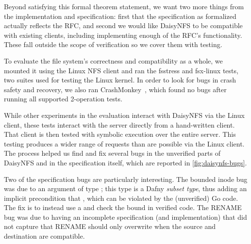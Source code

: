 Beyond satisfying this formal theorem statement, we want two more things from
the implementation and specification: first that the specification as formalized
actually reflects the RFC, and second we would like DaisyNFS to be compatible
with existing clients, including implementing enough of the RFC's functionality.
These fall outside the scope of verification so we cover them with testing.

To evaluate the file system's correctness and compatibility as a whole, we
mounted it using the Linux NFS client and ran the fsstress and fsx-linux tests,
two suites used for testing the Linux kernel. In order to look for bugs in crash
safety and recovery, we also ran CrashMonkey~\cite{mohan:crashmonkey}, which
found no bugs after running all supported 2-operation tests.

While other experiments in the evaluation interact with DaisyNFS via the Linux
client, these tests interact with the server directly from a hand-written
client. That client is then tested with symbolic execution over the entire server.
This testing produces a wider range of requests than are possible via the Linux
client. The process helped us find and fix several bugs in the unverified parts
of DaisyNFS and in the specification itself, which are reported in
\cref{fig:daisynfs-bugs}.

Two of the specification bugs are particularly interesting. The bounded inode bug
was due to an  argument of type ; this type is a Dafny
\emph{subset type}, thus adding an implicit precondition that , which can be violated by the (unverified) Go code. The fix is to instead
use a  and check the bound in verified code. The RENAME bug was due
to having an incomplete specification (and implementation) that did not capture
that RENAME should only overwrite when the source and destination are
compatible.

